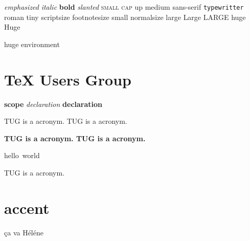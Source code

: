 \documentclass{article}
\newcommand{\TUG}{TeX Users Group}
\newcommand{\keyword}[1]{\textbf{#1}}
\newcommand{\keywordwithoption}[2][\bfseries]{{#1#2}}
\begin{document}
\emph{emphasized}
\textit{italic}
\textbf{bold}
\textsl{slanted}
\textsc{small cap}
\textup{up}
\textmd{medium}
\textsf{sans-serif}
\texttt{typewritter}
\textrm{roman}
\tiny{tiny}
\scriptsize{scriptsize}
\footnotesize{footnotesize}
\small{small}
\normalsize{normalsize}
\large{large}
\Large{Large}
\LARGE{LARGE}
\huge{huge}
\Huge{Huge}

\begin{huge}
  huge environment
\end{huge}

\normalsize{}
\section{\TUG}
\keyword{scope}
\keywordwithoption[\itshape]{declaration}
\keywordwithoption{declaration}

\parbox{2cm}{TUG is a acronym. TUG is a acronym.}


\parbox[t][2cm][b]{2cm}{\bfseries TUG is a acronym. TUG is a acronym.}

\mbox{hello world}


\begin{minipage}{1.0\linewidth}
  TUG is a acronym.
\end{minipage}

\section{accent}
ça va
Héléne
\end{document}
